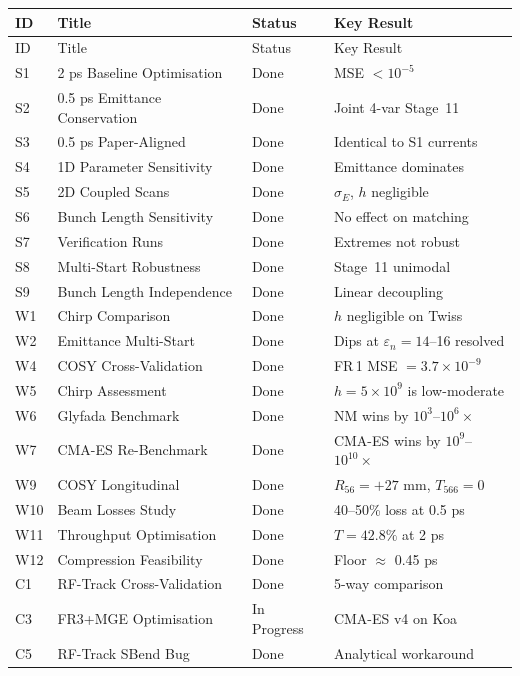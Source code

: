 \documentclass[11pt]{article}
\begin{document}
\small
\begin{longtable}{@{} l l l l @{}}
\toprule
ID & Title & Status & Key Result \\
\midrule
\endfirsthead
\toprule
ID & Title & Status & Key Result \\
\midrule
\endhead
\bottomrule
\endlastfoot
%
S1 & 2 ps Baseline Optimisation & Done & MSE $< 10^{-5}$ \\
S2 & 0.5 ps Emittance Conservation & Done & Joint 4-var Stage~11 \\
S3 & 0.5 ps Paper-Aligned & Done & Identical to S1 currents \\
S4 & 1D Parameter Sensitivity & Done & Emittance dominates \\
S5 & 2D Coupled Scans & Done & $\sigma_E$, $h$ negligible \\
S6 & Bunch Length Sensitivity & Done & No effect on matching \\
S7 & Verification Runs & Done & Extremes not robust \\
S8 & Multi-Start Robustness & Done & Stage~11 unimodal \\
S9 & Bunch Length Independence & Done & Linear decoupling \\
\midrule
W1 & Chirp Comparison & Done & $h$ negligible on Twiss \\
W2 & Emittance Multi-Start & Done & Dips at $\varepsilon_n = 14$--16 resolved \\
W4 & COSY Cross-Validation & Done & FR\,1 MSE $= 3.7 \times 10^{-9}$ \\
W5 & Chirp Assessment & Done & $h = 5 \times 10^9$ is low-moderate \\
W6 & Glyfada Benchmark & Done & NM wins by $10^{3}$--$10^{6}\times$ \\
W7 & CMA-ES Re-Benchmark & Done & CMA-ES wins by $10^{9}$--$10^{10}\times$ \\
W9 & COSY Longitudinal & Done & $R_{56} = +27$ mm, $T_{566} = 0$ \\
W10 & Beam Losses Study & Done & 40--50\% loss at 0.5 ps \\
W11 & Throughput Optimisation & Done & $T = 42.8\%$ at 2 ps \\
W12 & Compression Feasibility & Done & Floor $\approx$ 0.45 ps \\
\midrule
C1 & RF-Track Cross-Validation & Done & 5-way comparison \\
C3 & FR3+MGE Optimisation & In Progress & CMA-ES v4 on Koa \\
C5 & RF-Track SBend Bug & Done & Analytical workaround \\

\end{longtable}
\end{document}
